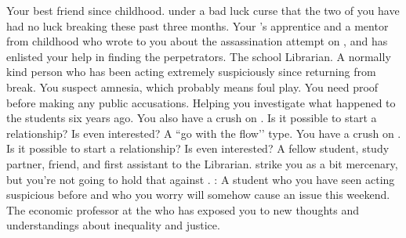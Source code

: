 \documentclass[char]{GL2020}
\begin{document}
\begin{contacts}
    \contact{\cInitiate{}} Your best friend since childhood. \cInitiate{\Theyare} under a bad luck curse that the two of you have had no luck breaking these past three months.
    \contact{\cJuniorStatesman{}} Your \cHeadDiplomat{\Auncle} \cHeadDiplomat{}'s apprentice and a mentor from childhood who wrote to you about the assassination attempt on \cHeadDiplomat{}, and has enlisted your help in finding the perpetrators.   
    \contact{\cLibrarian{}} The school Librarian. A normally kind person who has been acting extremely suspiciously since returning from break. You suspect amnesia, which probably means foul play. You need proof before making any public accusations.
    \contact{\cHeir{}} Helping you investigate what happened to the students six years ago. You also have a crush on \cHeir{\them}. Is it possible to start a relationship? Is \cHeir{} even interested?
    \contact{\cChupStudent{}} A ``go with the flow’’ type. You have a crush on \cChupStudent{\them}. Is it possible to start a relationship? Is \cChupStudent{} even interested?
    \contact{\cLibAssist{}} A fellow student, study partner, friend, and first assistant to the Librarian. \cLibAssist{\They} strike\cLibAssist{\verbs} you as a bit mercenary, but you're not going to hold that against \cLibAssist{\them}.
\contact{\cPirateChild{}}: A \pShippie{} student who you have seen acting suspicious before and who you worry will somehow cause an issue this weekend.  
    \contact{\cChupSecond{}} The economic professor at the \pSchool{} who has exposed you to new thoughts and understandings about inequality and justice.
\end{contacts}
\end{document}
